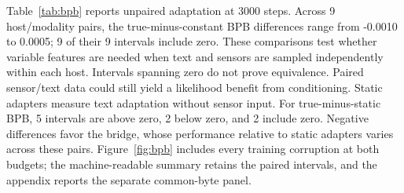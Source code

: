 Table~\ref{tab:bpb} reports unpaired adaptation at 3000 steps. Across 9 host/modality pairs, the true-minus-constant BPB differences range from -0.0010 to 0.0005; 9 of their 9 intervals include zero. These comparisons test whether variable features are needed when text and sensors are sampled independently within each host. Intervals spanning zero do not prove equivalence. Paired sensor/text data could still yield a likelihood benefit from conditioning. Static adapters measure text adaptation without sensor input. For true-minus-static BPB, 5 intervals are above zero, 2 below zero, and 2 include zero. Negative differences favor the bridge, whose performance relative to static adapters varies across these pairs. Figure~\ref{fig:bpb} includes every training corruption at both budgets; the machine-readable summary retains the paired intervals, and the appendix reports the separate common-byte panel.

